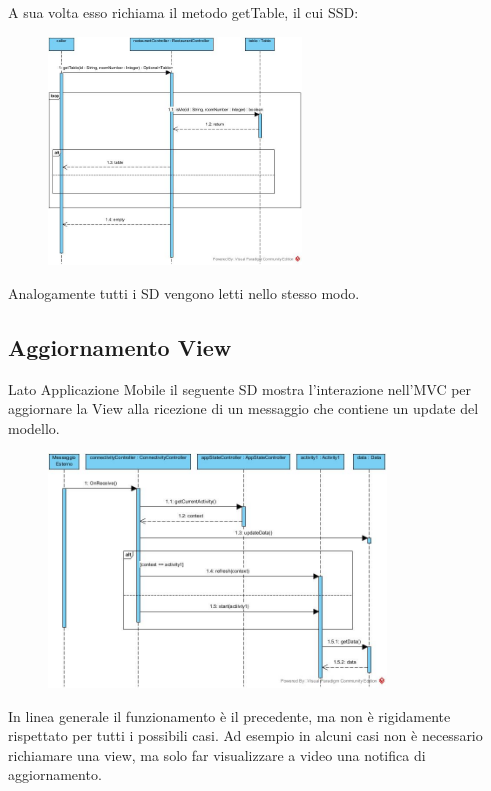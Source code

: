 A sua volta esso richiama il metodo getTable, il cui SSD:
 \begin{figure}[H]
	\centering
	\includegraphics[width=0.6\textwidth]{Immagini/tablesAndOrdersArea_getTable.jpg}
\end{figure}

\vspace{1cm}
Analogamente tutti i SD vengono letti nello stesso modo.

\subsection{Aggiornamento View}
Lato Applicazione Mobile il seguente SD mostra l'interazione nell'MVC per aggiornare la View alla ricezione di un messaggio che contiene un update del modello.
\begin{figure}[H]
	\centering
	\includegraphics[width=0.8\textwidth]{Immagini/aggiornamento_view.jpg}
\end{figure}
In linea generale il funzionamento è il precedente, ma non è rigidamente rispettato per tutti i possibili casi. Ad esempio in alcuni casi non è necessario richiamare una view, ma solo far visualizzare a video una notifica di aggiornamento.


